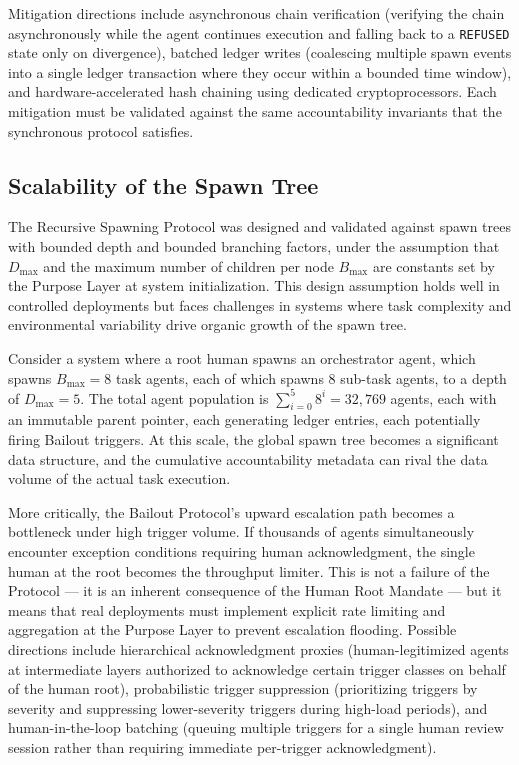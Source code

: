 Mitigation directions include asynchronous chain verification (verifying the chain asynchronously while the agent continues execution and falling back to a \texttt{REFUSED} state only on divergence), batched ledger writes (coalescing multiple spawn events into a single ledger transaction where they occur within a bounded time window), and hardware-accelerated hash chaining using dedicated cryptoprocessors. Each mitigation must be validated against the same accountability invariants that the synchronous protocol satisfies.

\subsection{Scalability of the Spawn Tree}

The Recursive Spawning Protocol was designed and validated against spawn trees with bounded depth and bounded branching factors, under the assumption that $D_{\max}$ and the maximum number of children per node $B_{\max}$ are constants set by the Purpose Layer at system initialization. This design assumption holds well in controlled deployments but faces challenges in systems where task complexity and environmental variability drive organic growth of the spawn tree.

Consider a system where a root human spawns an orchestrator agent, which spawns $B_{\max} = 8$ task agents, each of which spawns 8 sub-task agents, to a depth of $D_{\max} = 5$. The total agent population is $\sum_{i=0}^{5} 8^i = 32,\!769$ agents, each with an immutable parent pointer, each generating ledger entries, each potentially firing Bailout triggers. At this scale, the global spawn tree becomes a significant data structure, and the cumulative accountability metadata can rival the data volume of the actual task execution.

More critically, the Bailout Protocol's upward escalation path becomes a bottleneck under high trigger volume. If thousands of agents simultaneously encounter exception conditions requiring human acknowledgment, the single human at the root becomes the throughput limiter. This is not a failure of the Protocol --- it is an inherent consequence of the Human Root Mandate --- but it means that real deployments must implement explicit rate limiting and aggregation at the Purpose Layer to prevent escalation flooding. Possible directions include hierarchical acknowledgment proxies (human-legitimized agents at intermediate layers authorized to acknowledge certain trigger classes on behalf of the human root), probabilistic trigger suppression (prioritizing triggers by severity and suppressing lower-severity triggers during high-load periods), and human-in-the-loop batching (queuing multiple triggers for a single human review session rather than requiring immediate per-trigger acknowledgment).

